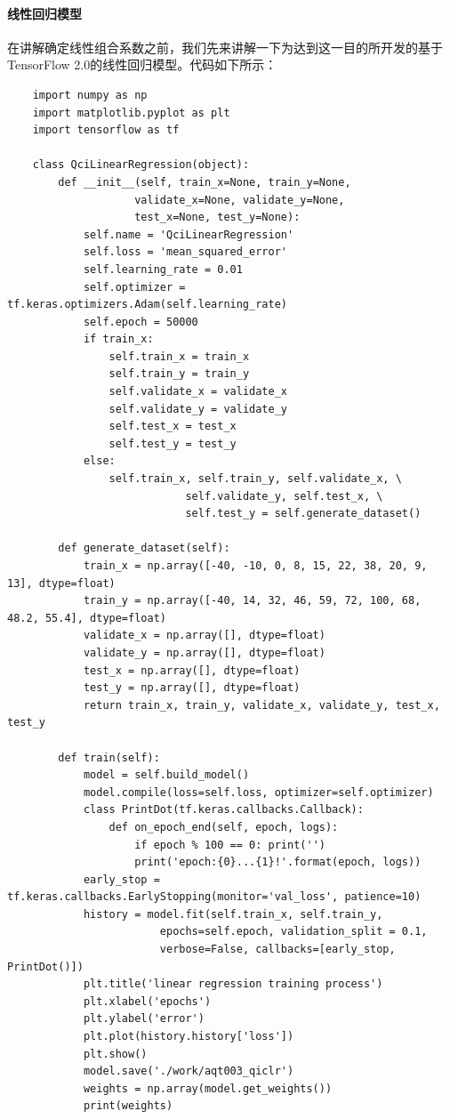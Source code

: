 \documentclass{article}
\begin{document}
\paragraph{线性回归模型}
在讲解确定线性组合系数之前，我们先来讲解一下为达到这一目的所开发的基于TensorFlow 2.0的线性回归模型。代码如下所示：
\begin{lstlisting}
    import numpy as np
    import matplotlib.pyplot as plt
    import tensorflow as tf
    
    class QciLinearRegression(object):
        def __init__(self, train_x=None, train_y=None, 
                    validate_x=None, validate_y=None, 
                    test_x=None, test_y=None):
            self.name = 'QciLinearRegression'
            self.loss = 'mean_squared_error'
            self.learning_rate = 0.01
            self.optimizer = tf.keras.optimizers.Adam(self.learning_rate)
            self.epoch = 50000
            if train_x:
                self.train_x = train_x
                self.train_y = train_y
                self.validate_x = validate_x
                self.validate_y = validate_y
                self.test_x = test_x
                self.test_y = test_y
            else:
                self.train_x, self.train_y, self.validate_x, \
                            self.validate_y, self.test_x, \
                            self.test_y = self.generate_dataset()
    
        def generate_dataset(self):
            train_x = np.array([-40, -10, 0, 8, 15, 22, 38, 20, 9, 13], dtype=float)
            train_y = np.array([-40, 14, 32, 46, 59, 72, 100, 68, 48.2, 55.4], dtype=float)
            validate_x = np.array([], dtype=float)
            validate_y = np.array([], dtype=float)
            test_x = np.array([], dtype=float)
            test_y = np.array([], dtype=float)
            return train_x, train_y, validate_x, validate_y, test_x, test_y
    
        def train(self):
            model = self.build_model()
            model.compile(loss=self.loss, optimizer=self.optimizer)
            class PrintDot(tf.keras.callbacks.Callback):
                def on_epoch_end(self, epoch, logs):
                    if epoch % 100 == 0: print('')
                    print('epoch:{0}...{1}!'.format(epoch, logs))
            early_stop = tf.keras.callbacks.EarlyStopping(monitor='val_loss', patience=10)
            history = model.fit(self.train_x, self.train_y, 
                        epochs=self.epoch, validation_split = 0.1,  
                        verbose=False, callbacks=[early_stop, PrintDot()])
            plt.title('linear regression training process')
            plt.xlabel('epochs')
            plt.ylabel('error')
            plt.plot(history.history['loss'])
            plt.show()
            model.save('./work/aqt003_qiclr')
            weights = np.array(model.get_weights())
            print(weights)
    

\end{lstlisting}
\end{document}

